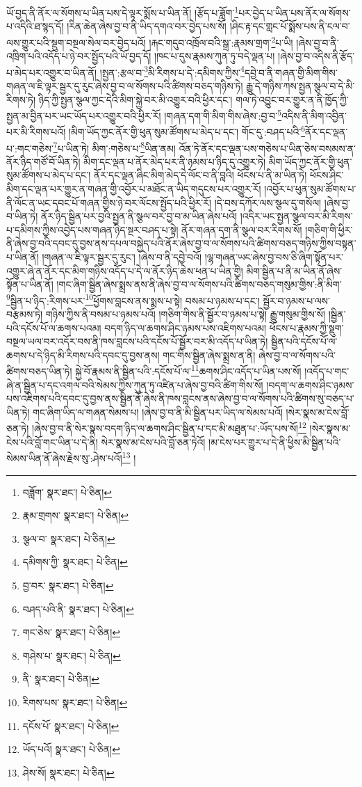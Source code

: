 ཡོ་བྱད་ནི་ནོར་ལ་སོགས་པ་ཡིན་པས་དེ་ལྟར་སྨོས་པ་ཡིན་ནོ། །རྩོད་པ་ཟློག་\footnote{བཟློག་  སྣར་ཐང་།  པེ་ཅིན། }པར་བྱེད་པ་ཡིན་པས་ནོར་ལ་སོགས་པ་འདིའི་ཐ་སྙད་དོ། །རིན་ཆེན་ཞེས་བྱ་བ་ནི་ཡིད་དགའ་བར་བྱེད་པས་སོ། །ཤིང་རྟ་དང་གླང་པོ་སྨོས་པས་ནི་ངལ་བ་ལས་གྱུར་པའི་སྡུག་བསྔལ་སེལ་བར་བྱེད་པའོ། །རྐང་གདུབ་འཁྲོལ་བའི་སྒྲ་:རྣམས་གྲག་\footnote{རྣམ་གྲགས་  སྣར་ཐང་།  པེ་ཅིན། }པ་ཡི། །ཞེས་བྱ་བ་ནི་འཁྲིག་པའི་འདོད་པ་ཉེ་བར་སྤྱོད་པའི་ཡོ་བྱད་དོ། །ཁང་པ་དུས་རྣམས་ཀུན་ཏུ་བདེ་ལྡན་པ། །ཞེས་བྱ་བ་འདིས་ནི་རྩོད་པ་མེད་པར་འགྱུར་བ་ཡིན་ནོ། །སྤྱན་:རྩལ་བ་\footnote{སྩལ་བ་  སྣར་ཐང་།  པེ་ཅིན། }མི་རིགས་པ་དེ་:དམིགས་ཀྱིས་\footnote{དམིགས་ཀྱི་  སྣར་ཐང་།  པེ་ཅིན། }དབྱེ་བ་ནི་གཞན་གྱི་མིག་གིས་གཞན་ལ་ཇི་ལྟར་སྦྱར་དུ་རུང་ཞེས་བྱ་བ་ལ་སོགས་པའི་ཚིགས་བཅད་གཉིས་ཏེ། རྒྱུ་དེ་གཉིས་ཀས་སྤྱན་སྩལ་བ་དེ་མི་རིགས་ཏེ། ཉིད་ཀྱི་སྤྱན་སྩལ་ཀྱང་དེའི་མིག་སྐྱེ་བར་མི་འགྱུར་བའི་ཕྱིར་དང་། གལ་ཏེ་འབྱུང་བར་གྱུར་ན་ནི་ཁྱོད་ཀྱི་སྤྱན་མ་བྱིན་པར་ཡང་ཡོད་པར་འགྱུར་བའི་ཕྱིར་རོ། །གཞན་དག་གི་མིག་གིས་ཞེས་:བྱ་བ་\footnote{བྱ་བར་  སྣར་ཐང་།  པེ་ཅིན། }འདིས་ནི་མིག་འབྱིན་པར་མི་རིགས་པའོ། །མིག་ཡོད་ཀྱང་ནོར་གྱི་ཕུན་སུམ་ཚོགས་པ་མེད་པ་དང་། གོང་དུ་:བཤད་པའི་\footnote{བཤད་པའི་ནི་  སྣར་ཐང་།  པེ་ཅིན། }ནོར་དང་ལྡན་པ་:གང་གཅེས་\footnote{གང་ཅེས་  སྣར་ཐང་།  པེ་ཅིན། }པ་ཡིན་ཏེ། མིག་:གཅེས་པ་\footnote{གཤེས་པ་  སྣར་ཐང་།  པེ་ཅིན། }ཡིན་ནམ། འོན་ཏེ་ནོར་དང་ལྡན་པས་གཅེས་པ་ཡིན་ཅེས་བསམས་ན་ནོར་ཉིད་གཙོ་བོ་ཡིན་ཏེ། མིག་དང་ལྡན་པ་ནོར་མེད་པར་ནི་ཉམས་པ་ཉིད་དུ་འགྱུར་ཏེ། མིག་ཡོད་ཀྱང་ནོར་གྱི་ཕུན་སུམ་ཚོགས་པ་མེད་པ་དང་། ནོར་དང་ལྡན་ཞིང་མིག་མེད་དེ་ལོང་བ་ནི་བླའི། ཕོངས་པ་ནི་མ་ཡིན་ཏེ། ཕོངས་ཤིང་མིག་དང་ལྡན་པར་གྱུར་ན་གཞན་གྱི་འབྱོར་པ་མཐོང་ན་ཡིད་གདུངས་པར་འགྱུར་རོ། །འབྱོར་པ་ཕུན་སུམ་ཚོགས་པ་ནི་ལོང་ན་ཡང་དབང་པོ་གཞན་གྱིས་ཉེ་བར་ལོངས་སྤྱོད་པའི་ཕྱིར་རོ། །དེ་བས་དཀོར་ལས་སྩལ་དུ་གསོལ། །ཞེས་བྱ་བ་ཡིན་ཏེ། ནོར་ཉིད་སྦྱིན་པར་བྱའི་སྤྱན་ནི་སྩལ་བར་བྱ་བ་མ་ཡིན་ཞེས་པའོ། །འདིར་ཡང་སྤྱན་སྩལ་བར་མི་རིགས་པ་དམིགས་ཀྱིས་འབྱེད་པས་གཞན་ཉིད་སྔར་བཤད་པ་སྟེ། ནོར་གཞན་དག་ནི་སྩལ་བར་རིགས་སོ། །གཅིག་གི་ཕྱིར་ནི་ཞེས་བྱ་བའི་དབང་དུ་བྱས་ནས་དཔལ་བསྐྱེད་པའི་ནོར་ཞེས་བྱ་བ་ལ་སོགས་པའི་ཚིགས་བཅད་གཉིས་ཀྱིས་བསྟན་པ་ཡིན་ནོ། །གཞན་ལ་ཇི་ལྟར་སྦྱར་དུ་རུང་། །ཞེས་བ་ནི་དབྱེ་བའོ། །ལྷ་གཞན་ཡང་ཞེས་བྱ་བས་ཅི་ཞིག་སྟོན་པར་འགྱུར་ཞེ་ན་ནོར་དང་མིག་གཉིས་འདོད་པ་དེ་ལ་ནོར་ཉིད་ཆེས་ཕན་པ་ཡིན་གྱི། མིག་སྦྱིན་པ་ནི་མ་ཡིན་ནོ་ཞེས་སྟོན་པ་ཡིན་ནོ། །གང་ཞིག་སྦྱིན་ཞེས་སྨྲས་ནས་ནི་ཞེས་བྱ་བ་ལ་སོགས་པའི་ཚིགས་བཅད་གསུམ་གྱིས་:ནི་མིག་\footnote{ནི་  སྣར་ཐང་།  པེ་ཅིན། }སྦྱིན་པ་ཉིད་:རིགས་པར་\footnote{རིགས་པས་  སྣར་ཐང་།  པེ་ཅིན། }ཕྱོགས་བླངས་ནས་སྨས་པ་སྟེ། བསམ་པ་ཉམས་པ་དང་། སྦྱོར་བ་ཉམས་པ་ལས་བརྩམས་ཏེ། གཉིས་ཀྱིས་ནི་བསམ་པ་ཉམས་པའོ། །གཅིག་གིས་ནི་སྦྱོར་བ་ཉམས་པ་སྟེ། རྒྱུ་གསུམ་གྱིས་སོ། །སྦྱིན་པའི་དངོས་པོ་ལ་ཆགས་པའམ། བདག་ཉིད་ལ་ཆགས་ཤིང་ཉམས་པས་འཇིགས་པའམ། ཕོངས་པ་རྣམས་ཀྱི་སྡུག་བསྔལ་ཡལ་བར་འདོར་བས་ནི་ཁས་བླངས་པའི་དངོས་པོ་སྦྱོར་བར་མི་འདོད་པ་ཡིན་ཏེ། སྦྱིན་པའི་དངོས་པོ་ལ་ཆགས་པ་དེ་ཉིད་མི་རིགས་པའི་དབང་དུ་བྱས་ནས། གང་གིས་སྦྱིན་ཞེས་སྨྲས་ན་ནི། ཞེས་བྱ་བ་ལ་སོགས་པའི་ཚིགས་བཅད་ཡིན་ཏེ། སྐྱེ་བོ་རྣམས་ནི་སྦྱིན་པའི་:དངོས་པོ་ལ་\footnote{དངོས་པོ་  སྣར་ཐང་།  པེ་ཅིན། }ཆགས་ཤིང་འདོད་པ་ཡིན་པས་སོ། །འདོད་པ་གང་ཞེ་ན་སྦྱིན་པ་དང་འགལ་བའི་སེམས་ཀྱིས་ཀུན་ཏུ་འཛིན་པ་ཞེས་བྱ་བའི་ཚིག་གིས་སོ། །བདག་ལ་ཆགས་ཤིང་ཉམས་པས་འཇིགས་པའི་དབང་དུ་བྱས་ནས་སྦྱིན་ནོ་ཞེས་ནི་ཁས་བླངས་ནས་ཞེས་བྱ་བ་ལ་སོགས་པའི་ཚིགས་སུ་བཅད་པ་ཡིན་ཏེ། གང་ཞིག་ཡིད་ལ་གཞན་སེམས་པ། །ཞེས་བྱ་བ་ནི་མི་སྦྱིན་པར་ཡིད་ལ་སེམས་པའོ། །སེར་སྣས་མ་ངེས་བློ་ཅན་ཏེ། །ཞེས་བྱ་བ་ནི་སེར་སྣས་བདག་ཉིད་ལ་ཆགས་ཤིང་སྦྱིན་པ་དང་མི་མཐུན་པ་:ཡོད་པས་སོ།\footnote{ཡོད་པའོ།  སྣར་ཐང་།  པེ་ཅིན། } །སེར་སྣས་མ་ངེས་པའི་བློ་གང་ཡིན་པ་དེ་ནི། སེར་སྣས་མ་ངེས་པའི་བློ་ཅན་ཏེའོ། །མ་ངེས་པར་གྱུར་པ་དེ་ནི་ཕྱིས་མི་སྦྱིན་པའི་སེམས་ཡིན་ནོ་ཞེས་རྗེས་སུ་:ཤེས་པའོ།\footnote{ཤེས་སོ།  སྣར་ཐང་།  པེ་ཅིན། } །
